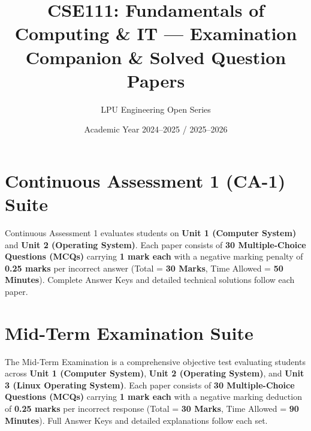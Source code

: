 \documentclass[a4paper,11pt,oneside,openany]{book}
\title{CSE111: Fundamentals of Computing \& IT --- Examination Companion \& Solved Question Papers}
\author{LPU Engineering Open Series}
\date{Academic Year 2024--2025 / 2025--2026}
\begin{document}
\frontmatter





\tableofcontents
\newpage

\mainmatter

\chapter{Continuous Assessment 1 (CA-1) Suite}
\label{chap:ca1}
\noindent
Continuous Assessment 1 evaluates students on \textbf{Unit 1 (Computer System)} and \textbf{Unit 2 (Operating System)}. Each paper consists of \textbf{30 Multiple-Choice Questions (MCQs)} carrying \textbf{1 mark each} with a negative marking penalty of \textbf{0.25 marks} per incorrect answer (Total = \textbf{30 Marks}, Time Allowed = \textbf{50 Minutes}). Complete Answer Keys and detailed technical solutions follow each paper.

\newpage





\chapter{Mid-Term Examination Suite}
\label{chap:midterm}
\noindent
The Mid-Term Examination is a comprehensive objective test evaluating students across \textbf{Unit 1 (Computer System)}, \textbf{Unit 2 (Operating System)}, and \textbf{Unit 3 (Linux Operating System)}. Each paper consists of \textbf{30 Multiple-Choice Questions (MCQs)} carrying \textbf{1 mark each} with a negative marking deduction of \textbf{0.25 marks} per incorrect response (Total = \textbf{30 Marks}, Time Allowed = \textbf{90 Minutes}). Full Answer Keys and detailed explanations follow each set.
\end{document}
